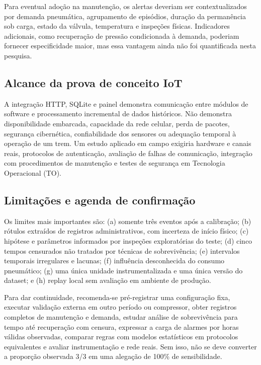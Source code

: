 \documentclass[conference]{IEEEtran}
\begin{document}
Para eventual adoção na manutenção, os alertas deveriam ser contextualizados por demanda pneumática, agrupamento de episódios, duração da permanência sob carga, estado da válvula, temperatura e inspeções físicas. Indicadores adicionais, como recuperação de pressão condicionada à demanda, poderiam fornecer especificidade maior, mas essa vantagem ainda não foi quantificada nesta pesquisa.

\subsection{Alcance da prova de conceito IoT}

A integração HTTP, SQLite e painel demonstra comunicação entre módulos de software e processamento incremental de dados históricos. Não demonstra disponibilidade embarcada, capacidade da rede celular, perda de pacotes, segurança cibernética, confiabilidade dos sensores ou adequação temporal à operação de um trem. Um estudo aplicado em campo exigiria hardware e canais reais, protocolos de autenticação, avaliação de falhas de comunicação, integração com procedimentos de manutenção e testes de segurança em Tecnologia Operacional (TO).

\subsection{Limitações e agenda de confirmação}

Os limites mais importantes são: (a) somente três eventos após a calibração; (b) rótulos extraídos de registros administrativos, com incerteza de início físico; (c) hipótese e parâmetros informados por inspeções exploratórias do teste; (d) cinco tempos censurados não tratados por técnicas de sobrevivência; (e) intervalos temporais irregulares e lacunas; (f) influência desconhecida do consumo pneumático; (g) uma única unidade instrumentalizada e uma única versão do dataset; e (h) replay local sem avaliação em ambiente de produção.

Para dar continuidade, recomenda-se pré-registrar uma configuração fixa, executar validação externa em outro período ou compressor, obter registros completos de manutenção e demanda, estudar análise de sobrevivência para tempo até recuperação com censura, expressar a carga de alarmes por horas válidas observadas, comparar regras com modelos estatísticos em protocolos equivalentes e avaliar instrumentação e rede reais. Sem isso, não se deve converter a proporção observada 3/3 em uma alegação de 100\% de sensibilidade.
\end{document}
